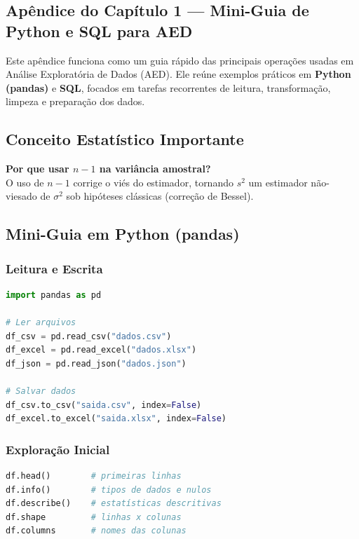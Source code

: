 \begin{appendices}

\chapter*{Apêndice do Capítulo 1 — Mini-Guia de Python e SQL para AED}

Este apêndice funciona como um guia rápido das principais operações usadas em Análise Exploratória de Dados (AED).  
Ele reúne exemplos práticos em \textbf{Python (pandas)} e \textbf{SQL}, focados em tarefas recorrentes de leitura, transformação, limpeza e preparação dos dados.

\section*{Conceito Estatístico Importante}
\begin{ProofBox}
\textbf{Por que usar $n-1$ na variância amostral?}\\[4pt]
O uso de $n-1$ corrige o viés do estimador, tornando $s^2$ um estimador não-viesado de $\sigma^2$ sob hipóteses clássicas (correção de Bessel).
\end{ProofBox}

\section{Mini-Guia em Python (pandas)}

\subsection*{Leitura e Escrita}
\begin{lstlisting}[language=Python,caption={Carregar e salvar dados}]
import pandas as pd

# Ler arquivos
df_csv = pd.read_csv("dados.csv")
df_excel = pd.read_excel("dados.xlsx")
df_json = pd.read_json("dados.json")

# Salvar dados
df_csv.to_csv("saida.csv", index=False)
df_excel.to_excel("saida.xlsx", index=False)
\end{lstlisting}

\subsection*{Exploração Inicial}
\begin{lstlisting}[language=Python,caption={Inspeção rápida de dados}]
df.head()        # primeiras linhas
df.info()        # tipos de dados e nulos
df.describe()    # estatísticas descritivas
df.shape         # linhas x colunas
df.columns       # nomes das colunas
\end{lstlisting}


\end{appendices}
